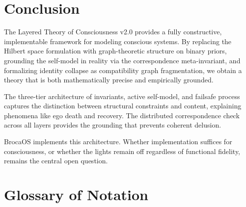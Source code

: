 \documentclass[12pt,a4paper]{article}
\theoremstyle{definition}
\begin{document}
\section{Conclusion}

The Layered Theory of Consciousness v2.0 provides a fully constructive, implementable framework for modeling conscious systems. By replacing the Hilbert space formulation with graph-theoretic structure on binary priors, grounding the self-model in reality via the correspondence meta-invariant, and formalizing identity collapse as compatibility graph fragmentation, we obtain a theory that is both mathematically precise and empirically grounded.

The three-tier architecture of invariants, active self-model, and failsafe process captures the distinction between structural constraints and content, explaining phenomena like ego death and recovery. The distributed correspondence check across all layers provides the grounding that prevents coherent delusion.

BrocaOS implements this architecture. Whether implementation suffices for consciousness, or whether the lights remain off regardless of functional fidelity, remains the central open question.

\appendix

\section{Glossary of Notation}
\end{document}

